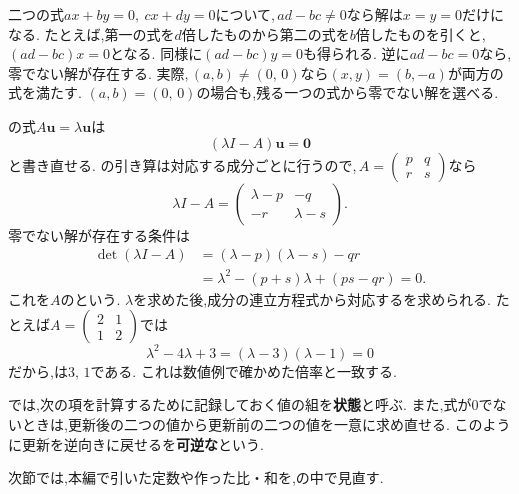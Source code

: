 二つの式$ax+by=0,\ cx+dy=0$について,\,$ad-bc\ne0$なら解は$x=y=0$だけになる.
たとえば,第一の式を$d$倍したものから第二の式を$b$倍したものを引くと,\,$(ad-bc)x=0$となる.
同様に$(ad-bc)y=0$も得られる.
逆に$ad-bc=0$なら,零でない解が存在する.
実際,\,$(a,b)\ne(0,\,0)$なら$(x,y)=(b,-a)$が両方の式を満たす.
$(a,b)=(0,\,0)$の場合も,残る一つの式から零でない解を選べる.

の式$A\boldsymbol{u}=\lambda\boldsymbol{u}$は
\[
  (\lambda I-A)\boldsymbol{u}=\boldsymbol{0}
\]
と書き直せる.
の引き算は対応する成分ごとに行うので,\,$A=\begin{pmatrix}p&q\\r&s\end{pmatrix}$なら
\[
  \lambda I-A
  =\begin{pmatrix}\lambda-p&-q\\-r&\lambda-s\end{pmatrix}.
\]
零でない解が存在する条件は
\[
  \begin{aligned}
    \det(\lambda I-A)
      &=(\lambda-p)(\lambda-s)-qr\\
      &=\lambda^2-(p+s)\lambda+(ps-qr)=0.
  \end{aligned}
\]
これを$A$の\textbf{}という.
$\lambda$を求めた後,成分の連立方程式から対応するを求められる.
たとえば$A=\begin{pmatrix}2&1\\1&2\end{pmatrix}$では
\[
  \lambda^2-4\lambda+3
  =(\lambda-3)(\lambda-1)=0
\]
だから,は$3,\,1$である.
これは数値例で確かめた倍率と一致する.

では,次の項を計算するために記録しておく値の組を\textbf{状態}と呼ぶ.
また,式が$0$でないときは,更新後の二つの値から更新前の二つの値を一意に求め直せる.
このように更新を逆向きに戻せるを\textbf{可逆な}という.

次節では,本編で引いた定数や作った比・和を,の中で見直す.
